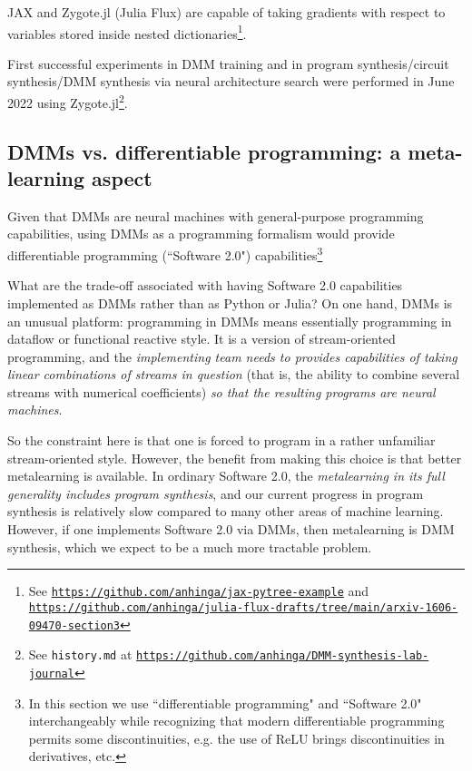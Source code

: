 \documentclass{article}
\begin{document}
JAX and Zygote.jl (Julia Flux) are capable of taking gradients with respect to variables stored inside 
nested dictionaries\footnote{See \href{https://github.com/anhinga/jax-pytree-example}{\tt https://github.com/anhinga/jax-pytree-example}
and\\ \href{https://github.com/anhinga/julia-flux-drafts/tree/main/arxiv-1606-09470-section3}
{\tt https://github.com/anhinga/julia-flux-drafts/tree/main/arxiv-1606-09470-section3}}.

First successful experiments in DMM training and in program synthesis/circuit synthesis/DMM synthesis via neural architecture search
were performed in June 2022 using Zygote.jl\footnote{See {\tt history.md} at
\href{https://github.com/anhinga/DMM-synthesis-lab-journal}{\tt https://github.com/anhinga/DMM-synthesis-lab-journal}}.

\subsection{DMMs vs. differentiable programming: a meta-learning aspect}

Given that DMMs are neural machines with general-purpose programming capabilities, using DMMs as a programming
formalism would provide differentiable programming (``Software 2.0") capabilities\footnote{In this section we use 
``differentiable programming" and ``Software 2.0" interchangeably while recognizing that modern differentiable
programming permits some discontinuities, e.g. the use of ReLU brings discontinuities in derivatives, etc.}

What are the trade-off associated with having Software 2.0 capabilities implemented as DMMs rather
than as Python or Julia? On one hand, DMMs is an unusual platform: programming in DMMs
means essentially programming in dataflow or functional reactive style. It is a version of
stream-oriented programming, and the {\em implementing team needs to provides capabilities of taking linear
combinations of streams in question} (that is, the ability to combine several streams with
numerical coefficients) {\em so that the resulting programs are neural machines}.

So the constraint here is that one is forced to program in a rather unfamiliar stream-oriented style.
However, the benefit from making this choice is that better metalearning is available. In ordinary Software 2.0,
the {\em metalearning in its full generality includes program synthesis}, and our current progress in
program synthesis is relatively slow compared to many other areas of machine learning.
However, if one implements Software 2.0 via DMMs, then metalearning is DMM synthesis,
which we expect to be a much more tractable problem.
\end{document}
